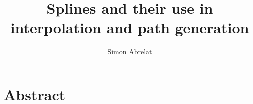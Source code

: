 \documentclass{article}
\title{Splines and their use in interpolation and path generation}
\author{Simon Abrelat}
\date{\vspace{-5ex}}
\begin{document}
\maketitle{}
\newpage
\tableofcontents

\section{Abstract}
\end{document}
